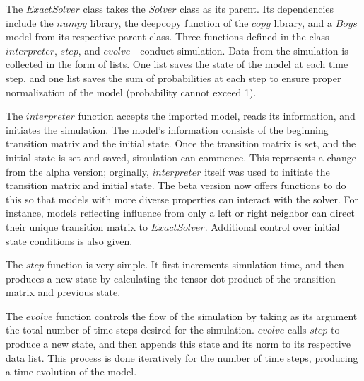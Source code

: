 \documentclass[english]{article}
\begin{document}
The $ExactSolver$ class takes the $Solver$ class as its parent. Its dependencies include the $numpy$ library, the deepcopy function of the $copy$ library, and a $Boys$ model from its respective parent class. Three functions defined in the class - $interpreter$, $step$, and $evolve$ - conduct simulation. Data from the simulation is collected in the form of lists. One list saves the state of the model at each time step, and one list saves the sum of probabilities at each step to ensure proper normalization of the model (probability cannot exceed 1).

The $interpreter$ function accepts the imported model, reads its information, and initiates the simulation. The model's information consists of the beginning transition matrix and the initial state. Once the transition matrix is set, and the initial state is set and saved, simulation can commence. This represents a change from the alpha version; orginally, $interpreter$ itself was used to initiate the transition matrix and initial state. The beta version now offers functions to do this so that models with more diverse properties can interact with the solver. For instance, models reflecting influence from only a left or right neighbor can direct their unique transition matrix to $ExactSolver$. Additional control over initial state conditions is also given.

The $step$ function is very simple. It first increments simulation time, and then produces a new state by calculating the tensor dot product of the transition matrix and previous state.

The $evolve$ function controls the flow of the simulation by taking as its argument the total number of time steps desired for the simulation. $evolve$ calls $step$ to produce a new state, and then appends this state and its norm to its respective data list. This process is done iteratively for the number of time steps, producing a time evolution of the model. 
\end{document}
